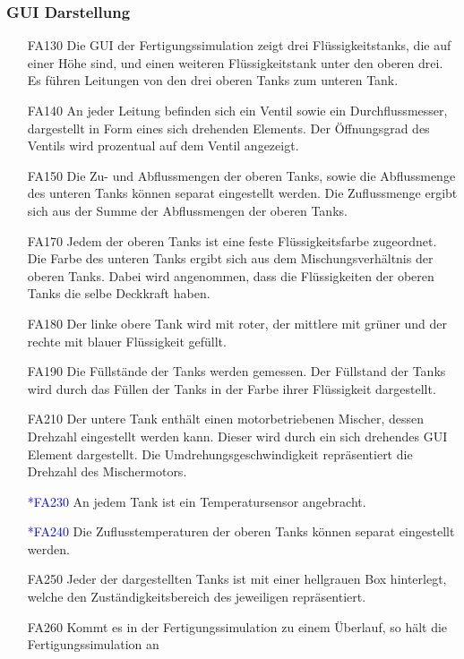 \documentclass[parskip=full]{scrartcl}
\begin{document}
\subsubsection{GUI Darstellung}
\begin{enumerate}
  \item[FA130] Die \gls{GUI} der \gls{Fertigungssimulation} zeigt drei Flüssigkeitstanks, die auf einer Höhe sind, und einen weiteren Flüssigkeitstank unter den oberen drei.
    Es führen Leitungen von den drei oberen Tanks zum unteren Tank.
  \item[FA140] An jeder Leitung befinden sich ein Ventil sowie ein Durchflussmesser, dargestellt in Form eines sich drehenden Elements. Der Öffnungsgrad des Ventils wird prozentual auf dem Ventil angezeigt.
  \item[FA150] Die Zu- und Abflussmengen der oberen Tanks, sowie die Abflussmenge des unteren Tanks können separat eingestellt werden. Die Zuflussmenge ergibt sich aus der Summe der Abflussmengen der oberen Tanks.
  \item[FA170] Jedem der oberen Tanks ist eine feste Flüssigkeitsfarbe zugeordnet. Die Farbe des unteren Tanks ergibt sich aus dem Mischungsverhältnis der oberen Tanks. Dabei wird
	angenommen, dass die Flüssigkeiten der oberen Tanks die selbe Deckkraft haben.
  \item[FA180] Der linke obere Tank wird mit roter, der mittlere mit grüner und der rechte mit blauer Flüssigkeit gefüllt.
  \item[FA190] Die Füllstände der Tanks werden gemessen. Der Füllstand der Tanks wird durch das Füllen der Tanks in der Farbe ihrer Flüssigkeit dargestellt.
  \item[FA210] Der untere Tank enthält einen motorbetriebenen Mischer, dessen Drehzahl eingestellt werden kann. Dieser wird durch ein sich drehendes \gls{GUI} Element dargestellt.
    Die Umdrehungsgeschwindigkeit repräsentiert die Drehzahl des Mischermotors.
  \item[\textcolor{blue}{*FA230}] An jedem Tank ist ein Temperatursensor angebracht.
  \item[\textcolor{blue}{*FA240}] Die Zuflusstemperaturen der oberen Tanks können separat eingestellt werden.
  \item[FA250] Jeder der dargestellten Tanks ist mit einer hellgrauen Box hinterlegt, welche den Zuständigkeitsbereich des jeweiligen  repräsentiert.
  \item[FA260] Kommt es in der \gls{Fertigungssimulation} zu einem \"Uberlauf, so h\"alt die \gls{Fertigungssimulation} an

\end{enumerate}
\end{document}
